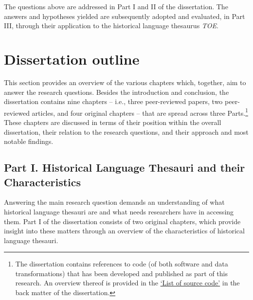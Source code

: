 \noindent The questions above are addressed in Part I and II of the dissertation. The answers and hypotheses yielded are subsequently adopted and evaluated, in Part III, through their application to the historical language thesaurus \textit{TOE}. 



\section{Dissertation outline} \label{sect:Introduction:Methodology}

This section provides an overview of the various chapters which, together, aim to answer the research questions. Besides the introduction and conclusion, the dissertation contains nine chapters -- i.e., three peer-reviewed papers, two peer-reviewed articles, and four original chapters -- that are spread across three Parts.\footnote{The dissertation contains references to code (of both software and data transformations) that has been developed and published as part of this research. An overview thereof is provided in the \hyperref[fm:sourcecode]{`List of source code'} in the back matter of the dissertation.} These chapters are discussed in terms of their position within the overall dissertation, their relation to the research questions, and their approach and most notable findings.


\subsection*{Part I. Historical Language Thesauri and their Characteristics}

Answering the main research question demands an understanding of what historical language thesauri are and what needs researchers have in accessing them. Part I of the dissertation consists of two original chapters, which provide insight into these matters through an overview of the characteristics of historical language thesauri.


